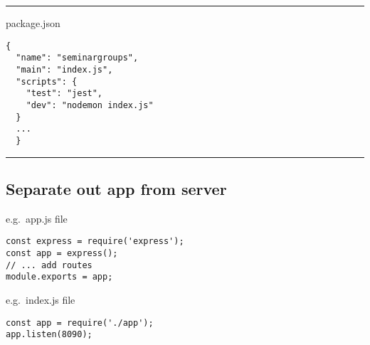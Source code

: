 \documentclass{article}[18pt]
\begin{document}
\begin{center}\rule{0.5\linewidth}{\linethickness}\end{center}

package.json

\begin{verbatim}
{
  "name": "seminargroups",
  "main": "index.js",
  "scripts": {
    "test": "jest",
    "dev": "nodemon index.js"
  }
  ...
  }
\end{verbatim}

\begin{center}\rule{0.5\linewidth}{\linethickness}\end{center}

\hypertarget{separate-out-app-from-server}{%
\subsection{Separate out app from
server}\label{separate-out-app-from-server}}

e.g.~app.js file

\begin{verbatim}
const express = require('express');
const app = express();
// ... add routes
module.exports = app;
\end{verbatim}

e.g.~index.js file

\begin{verbatim}
const app = require('./app');
app.listen(8090);
\end{verbatim}
\end{document}
